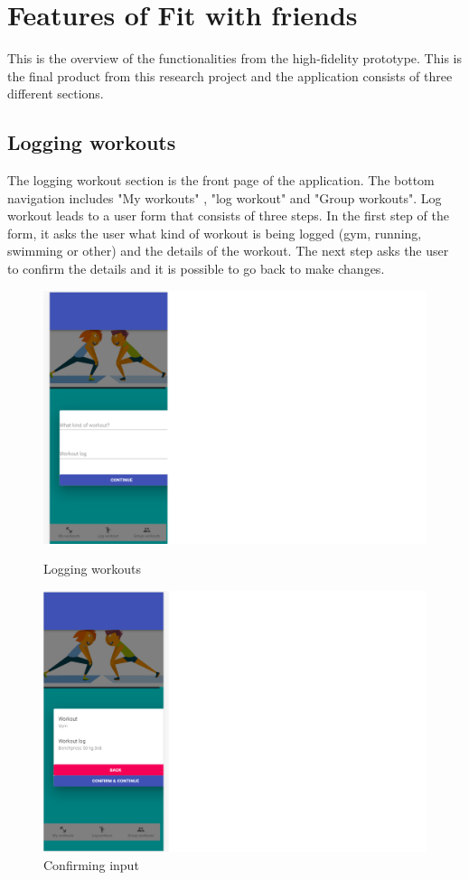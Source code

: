 \chapter{Features of Fit with friends}
This is the overview of the functionalities from the high-fidelity prototype. This is the final product from this research project and the application consists of three different sections.

\section{Logging workouts}
The logging workout section is the front page of the application. The bottom navigation includes "My workouts" , "log workout" and "Group workouts". Log workout leads to a user form that consists of three steps. In the first step of the form, it asks the user what kind of workout is being logged (gym, running, swimming or other) and the details of the workout. The next step asks the user to confirm the details and it is possible to go back to make changes.
\begin{figure}[H]
  \centering
  \begin{minipage}[b]{0.4\textwidth}
    \includegraphics[width=\textwidth]{figures/loggingworkouts.png}
    \caption{Logging workouts}
  \end{minipage}
  \hfill
  \begin{minipage}[b]{0.4\textwidth}
    \includegraphics[width=\textwidth]{figures/confirmworkouts.png}
    \caption{Confirming input}
  \end{minipage}
\end{figure}
